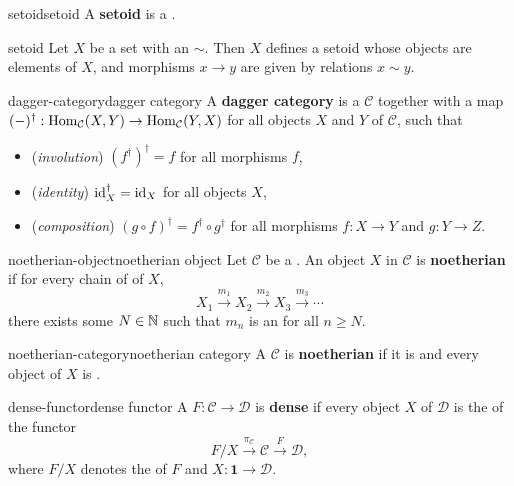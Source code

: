 \begin{topic}{setoid}{setoid}
    A \textbf{setoid} is a  .
\end{topic}

\begin{example}{setoid}
    Let $X$ be a set with an  $\sim$. Then $X$ defines a setoid whose objects are elements of $X$, and morphisms $x \to y$ are given by relations $x \sim y$.
\end{example}

\begin{topic}{dagger-category}{dagger category}
    A \textbf{dagger category} is a  $\mathcal{C}$ together with a map $(-)^\dagger : \operatorname{Hom}_\mathcal{C}(X, Y) \to \operatorname{Hom}_\mathcal{C}(Y, X)$ for all objects $X$ and $Y$ of $\mathcal{C}$, such that
    \begin{itemize}
        \item (\textit{involution}) $(f^\dagger)^\dagger = f$ for all morphisms $f$,
        \item (\textit{identity}) $\textup{id}_X^\dagger = \textup{id}_X$ for all objects $X$,
        \item (\textit{composition}) $(g \circ f)^\dagger = f^\dagger \circ g^\dagger$ for all morphisms $f : X \to Y$ and $g : Y \to Z$.
    \end{itemize}
\end{topic}

\begin{topic}{noetherian-object}{noetherian object}
    Let $\mathcal{C}$ be a . An object $X$ in $\mathcal{C}$ is \textbf{noetherian} if for every chain of  of $X$,
    \[ X_1 \xrightarrow{m_1} X_2 \xrightarrow{m_2} X_3 \xrightarrow{m_3} \cdots \]
    there exists some $N \in \mathbb{N}$ such that $m_n$ is an  for all $n \ge N$.
\end{topic}

\begin{topic}{noetherian-category}{noetherian category}
    A  $\mathcal{C}$ is \textbf{noetherian} if it is  and every object of $X$ is .
\end{topic}

\begin{topic}{dense-functor}{dense functor}
    A  $F : \mathcal{C} \to \mathcal{D}$ is \textbf{dense} if every object $X$ of $\mathcal{D}$ is the  of the functor
    \[ F/X \xrightarrow{\pi_\mathcal{C}} \mathcal{C} \xrightarrow{F} \mathcal{D} , \]
    where $F/X$ denotes the  of $F$ and $X : \textbf{1} \to \mathcal{D}$.
\end{topic}

